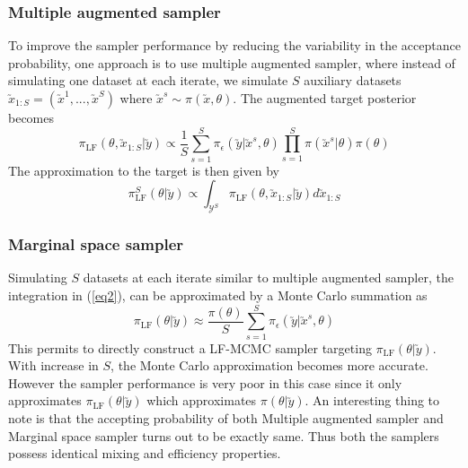 \begin{multicols}{2}
\subsubsection{Multiple augmented sampler}
To improve the sampler performance by reducing the variability in the acceptance probability, one approach is to use multiple augmented sampler\cite{andrieu2007expected}, where instead of simulating one dataset at each iterate, we simulate $S$ auxiliary datasets $\utilde{x}_{1:S}=(\utilde{x}^1,..., \utilde{x}^S)$ where $\utilde{x}^s \sim \pi(\utilde{x},\theta)$. The augmented target posterior becomes 
\begin{equation}
\pi_{\text{LF}}(\theta,\utilde{x}_{1:S}|\utilde{y}) \propto \dfrac{1}{S}\sum\limits_{s=1}^S\pi_{\epsilon}(\utilde{y}|\utilde{x}^{s},\theta)\prod\limits_{s=1}^S\pi(\utilde{x}^{s}|\theta)\pi(\theta)
\end{equation}
The approximation to the target is then given by 
\begin{equation}
\pi_{\text{LF}}^{S}(\theta|\utilde{y})\propto \int_{\mathcal{Y}^S}\pi_{\text{LF}}(\theta,\utilde{x}_{1:S}|\utilde{y})d\utilde{x}_{1:S}
\end{equation}

\subsubsection{Marginal space sampler}
Simulating $S$ datasets at each iterate similar to multiple augmented sampler, the integration in (\ref{eq2}), can be approximated by a Monte Carlo summation as 
\begin{equation}
\pi_{\text{LF}}(\theta|\utilde{y})\approx\dfrac{\pi(\theta)}{S}\sum\limits_{s=1}^S\pi_{\epsilon}(\utilde{y}|\utilde{x}^s,\theta)
\end{equation}
This permits to directly construct a LF-MCMC sampler targeting $\pi_{\text{LF}}(\theta|\utilde{y})$. With increase in $S$, the Monte Carlo approximation becomes more accurate. However the sampler performance is very poor in this case since it only approximates $\pi_{\text{LF}}(\theta|\utilde{y})$ which approximates $\pi(\theta|\utilde{y})$. An interesting thing to note is that the accepting probability of both Multiple augmented sampler and Marginal space sampler turns out to be exactly same. Thus both the samplers possess identical mixing and efficiency properties.


\end{multicols}
